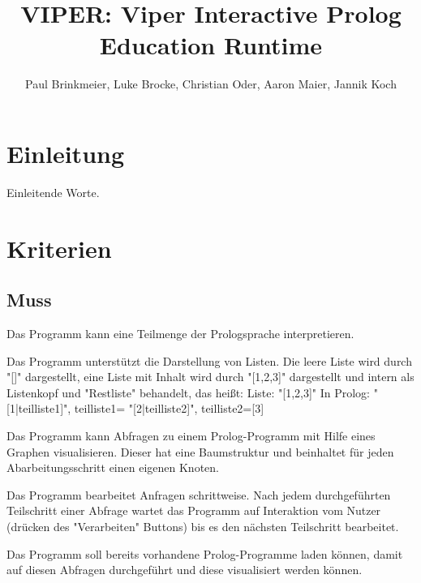 \documentclass[parskip=full,11pt,twoside]{scrartcl}
\title{VIPER: Viper Interactive Prolog Education Runtime}
\author{Paul Brinkmeier, Luke Brocke, Christian Oder, Aaron Maier, Jannik Koch}
\begin{document}
\maketitle

\section{Einleitung}

Einleitende Worte.

\pagebreak
\section{Kriterien}

\subsection{Muss}


Das Programm kann eine Teilmenge der Prologsprache interpretieren.


Das Programm unterstützt die Darstellung von Listen. Die leere Liste wird durch "[]" dargestellt, eine Liste mit Inhalt wird durch "[1,2,3]" dargestellt und intern als Listenkopf und "Restliste" behandelt, das heißt:\newline
Liste: "[1,2,3]"\newline
In Prolog: "[1|teilliste1]", teilliste1= "[2|teilliste2]", teilliste2=[3]


Das Programm kann Abfragen zu einem Prolog-Programm mit Hilfe eines Graphen visualisieren. Dieser hat eine Baumstruktur und beinhaltet für jeden Abarbeitungsschritt einen eigenen Knoten.


Das Programm bearbeitet Anfragen schrittweise. Nach jedem durchgeführten Teilschritt einer Abfrage wartet das Programm auf Interaktion vom Nutzer (drücken des "Verarbeiten" Buttons) bis es den nächsten Teilschritt bearbeitet.


Das Programm soll bereits vorhandene Prolog-Programme laden können, damit auf diesen Abfragen durchgeführt und diese visualisiert werden können.
\end{document}
